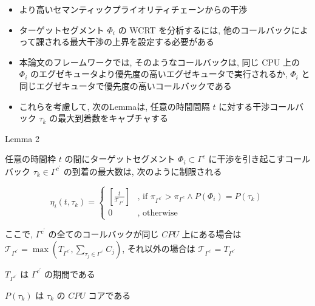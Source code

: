 \begin{frame}{}
    \begin{itemize}
        \item より高いセマンティックプライオリティチェーンからの干渉
        \item ターゲットセグメント $\Phi_{i}$ の WCRT を分析するには, 他のコールバックによって課される最大干渉の上界を設定する必要がある
        \item 本論文のフレームワークでは, そのようなコールバックは, 同じ CPU 上の $\Phi_{i}$ のエグゼキュータより優先度の高いエグゼキュータで実行されるか, $\Phi_{i}$ と同じエグゼキュータで優先度の高いコールバックである
        \item これらを考慮して, 次のLemmaは, 任意の時間間隔 $t$ に対する干渉コールバック $\tau_{k}$ の最大到着数をキャプチャする
    \end{itemize}
\end{frame}

\begin{frame}[label=lemma2]{Lemma 2}
    \begin{lemma}[]
        任意の時間枠 $t$ の間にターゲットセグメント $\Phi_{i} \subset \Gamma^{c}$ に干渉を引き起こすコールバック $\tau_{k} \in \Gamma^{c^{\prime}}$ の到着の最大数は, 次のように制限される

        \begin{equation*}
            \eta_{i}\left(t, \tau_{k}\right)= \begin{cases}{\left[\frac{t}{\mathcal{T}_{\Gamma^{c^{\prime}}}}\right]} & \text {, if } \pi_{\Gamma^{c^{\prime}}}>\pi_{\Gamma^{c}} \wedge P\left(\Phi_{i}\right)=P\left(\tau_{k}\right) \\ 0 &, \text { otherwise }\end{cases}
        \end{equation*}

        ここで, $\Gamma^{c^{\prime}}$ の全てのコールバックが同じ $C P U$ 上にある場合は $\mathcal{T}_{\Gamma^{c^{\prime}}}=\max \left(T_{\Gamma^{c^{\prime}}}, \sum_{\tau_{j} \in \Gamma^{c^{\prime}}} C_{j}\right)$, それ以外の場合は $\mathcal{T}_{\Gamma^{c^{\prime}}}=T_{\Gamma^{c^{\prime}}}$
        \item $T_{\Gamma^{c^{\prime}}}$ は $\Gamma^{c^{\prime}}$ の期間である
        \item $P\left(\tau_{k}\right)$ は $\tau_{k}$ の $C P U$ コアである
    \end{lemma}
\end{frame}

